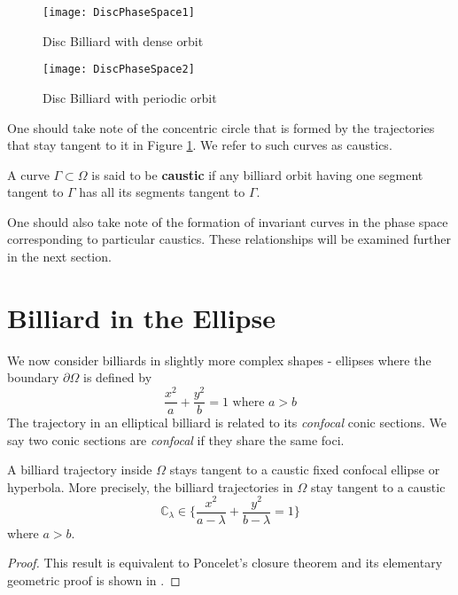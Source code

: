 \begin{figure}[h]
    \centering
    \texttt{[image: DiscPhaseSpace1]}
    \caption{Disc Billiard with dense orbit}
    \label{disc1}
\end{figure}
\begin{figure}[h]
    \centering
    \texttt{[image: DiscPhaseSpace2]}
    \caption{Disc Billiard with periodic orbit}
    \label{disc2}
\end{figure}
One should take note of the concentric circle that is formed by the trajectories that stay tangent to it in Figure \ref{disc1}. We refer to such curves as caustics. 
\begin{definition}
A curve $\Gamma \subset \Omega$ is said to be \textbf{caustic} if any billiard orbit having one segment tangent to $\Gamma$ has all its segments tangent to $\Gamma$.
\end{definition}
One should also take note of the formation of invariant curves in the phase space corresponding to particular caustics. These relationships will be examined further in the next section. 

\section{Billiard in the Ellipse}
We now consider billiards in slightly more complex shapes - ellipses where the boundary $\partial \Omega$ is defined by 
\begin{equation}
    \frac{x^2}{a} + \frac{y^2}{b} = 1 \text{   where } a > b
\end{equation}
The trajectory in an elliptical billiard is related to its \textit{confocal} conic sections. We say two conic sections are \textit{confocal} if they share the same foci. 
\begin{remark}
\label{caustic}
A billiard trajectory inside $\Omega$ stays tangent to a caustic fixed confocal ellipse or hyperbola. More precisely, the billiard trajectories in $\Omega$ stay tangent to a caustic 
\begin{equation}
    \mathbb{C}_{\lambda} \in \Big \{\frac{x^2}{a - \lambda} + \frac{y^2}{b - \lambda} = 1 \Big \}
\end{equation}
where $a > b$.
\end{remark}

\begin{proof}
This result is equivalent to Poncelet's closure theorem and its elementary geometric proof is shown in \cite{Tabachnikov2011}.
\end{proof}

